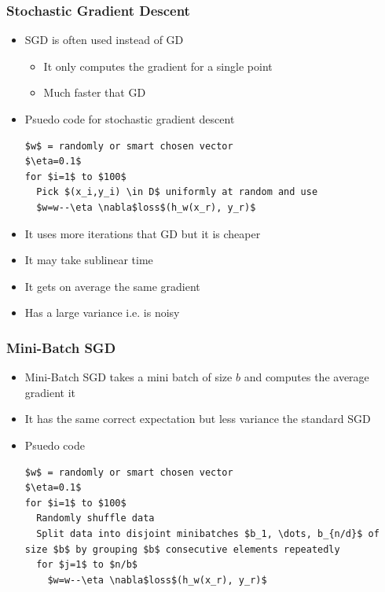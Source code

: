 \documentclass[a4, english]{article}
\begin{document}
\subsubsection{Stochastic Gradient Descent}
\begin{itemize}
  \item SGD is often used instead of GD 
  \begin{itemize}
  	\item It only computes the gradient for a single point
    \item Much faster that GD 
  \end{itemize}
  \item Psuedo code for stochastic gradient descent
\begin{lstlisting}[mathescape=true, keywordstyle=\ttfamily]
$w$ = randomly or smart chosen vector
$\eta=0.1$ 
for $i=1$ to $100$ 
  Pick $(x_i,y_i) \in D$ uniformly at random and use
  $w=w--\eta \nabla$loss$(h_w(x_r), y_r)$ 
\end{lstlisting} 
  \item It uses more iterations that GD but it is cheaper
  \item It may take sublinear time 
  \item It gets on average the same gradient
  \item Has a large variance i.e. is noisy 
\end{itemize}

\subsubsection{Mini-Batch SGD}
\begin{itemize}
	\item Mini-Batch SGD takes a mini batch of size $b$ and computes the average gradient it
  \item It has the same correct expectation but less variance the standard SGD 
  \item Psuedo code
\begin{lstlisting}[mathescape=true, keywordstyle=\ttfamily]
$w$ = randomly or smart chosen vector
$\eta=0.1$ 
for $i=1$ to $100$ 
  Randomly shuffle data 
  Split data into disjoint minibatches $b_1, \dots, b_{n/d}$ of size $b$ by grouping $b$ consecutive elements repeatedly 
  for $j=1$ to $n/b$ 
    $w=w--\eta \nabla$loss$(h_w(x_r), y_r)$ 
\end{lstlisting} 
\end{itemize}
\end{document}
